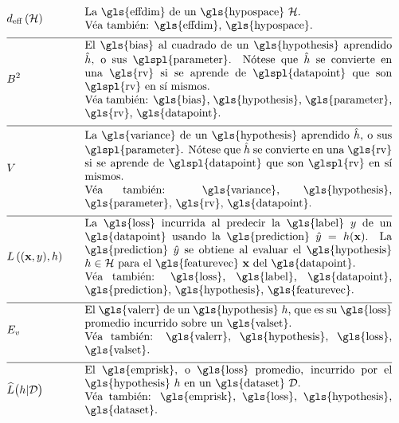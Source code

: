 \begin{align}
	&\effdim{\hypospace}  &\quad & \parbox{.80\textwidth}{La \gls{effdim} de un \gls{hypospace} $\hypospace$.
		\\ Véa también: \gls{effdim}, \gls{hypospace}.} \nonumber \\[2mm] \hline \nonumber\\[-5mm]
	&\biasterm^2 &\quad &\parbox{.80\textwidth}{
		El \gls{bias} al cuadrado de un \gls{hypothesis} aprendido $\learnthypothesis$, o sus \glspl{parameter}. Nótese que $\learnthypothesis$ 
		se convierte en una \gls{rv} si se aprende de \glspl{datapoint} que son \glspl{rv} en sí mismos.
		\\ Véa también: \gls{bias}, \gls{hypothesis}, \gls{parameter}, \gls{rv}, \gls{datapoint}.} \nonumber \\[2mm] \hline \nonumber\\[-5mm]
	&\varianceterm &\quad &\parbox{.80\textwidth}{La \gls{variance} de un \gls{hypothesis} aprendido 
		$\learnthypothesis$, o sus \glspl{parameter}. Nótese que $\learnthypothesis$ 
		se convierte en una \gls{rv} si se aprende de \glspl{datapoint} que son \glspl{rv} en sí mismos.
		\\ Véa también: \gls{variance}, \gls{hypothesis}, \gls{parameter}, \gls{rv}, \gls{datapoint}.} \nonumber \\[2mm] \hline \nonumber\\[-5mm]
	&\lossfunc{(\featurevec,\truelabel)}{\hypothesis}  &\quad & \parbox{.80\textwidth}{La \gls{loss} incurrida al predecir la 
		\gls{label} $\truelabel$ de un \gls{datapoint} usando la \gls{prediction} $\hat{\truelabel}=h(\featurevec)$. La 
		\gls{prediction} $\hat{\truelabel}$ se obtiene al evaluar el \gls{hypothesis} $\hypothesis \in \hypospace$ para 
		el \gls{featurevec} $\featurevec$ del \gls{datapoint}.
		\\ Véa también: \gls{loss}, \gls{label}, \gls{datapoint}, \gls{prediction}, \gls{hypothesis}, 
		\gls{featurevec}.} \nonumber \\[2mm] \hline \nonumber\\[-5mm] 
	&\valerror &\quad &\parbox{.80\textwidth}{El \gls{valerr} de un \gls{hypothesis} $\hypothesis$, que es su 
		\gls{loss} promedio incurrido sobre un \gls{valset}.
		\\ Véa también: \gls{valerr}, \gls{hypothesis}, \gls{loss}, \gls{valset}.} \nonumber \\[2mm] \hline \nonumber\\[-5mm]
	&\emperror\big(\hypothesis| \dataset \big) &\quad &\parbox{.80\textwidth}{El \gls{emprisk}, o \gls{loss} promedio, 
		incurrido por el \gls{hypothesis} $\hypothesis$ en un \gls{dataset} $\dataset$.
		\\ Véa también: \gls{emprisk}, \gls{loss}, \gls{hypothesis}, \gls{dataset}.} \nonumber 
\end{align}     


